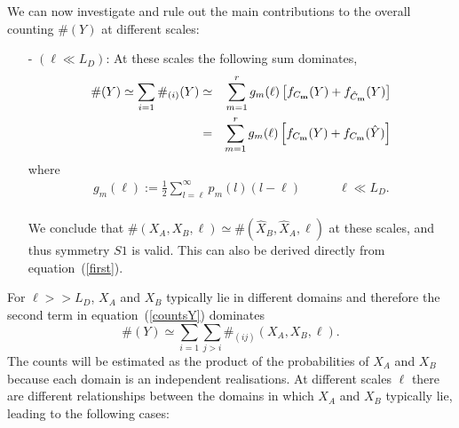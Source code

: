 \documentclass[fleqn,10pt]{wlscirep}
\def\sm{\textbf{\tiny m}}
\begin{document}
We can now investigate and rule out the main contributions to the overall counting $\#(Y)$  at different scales:
\begin{itemize}
\item [-]\textbf{$(\ell \ll L_D)$}: At these scales the following sum dominates,
\begin{eqnarray*}
\#(Y) \simeq \sum_{i=1} \#_{(i)}(Y)&\simeq&
     \sum_{m=1}^r g_m(\ell)  \left[ f_{C_\sm}(Y) + f_{\hat{C}_\sm}(Y) \right] \\
    &=&   \sum_{m=1}^r g_m(\ell) \left[  f_{C_\sm}(Y) +  f_{C_\sm}(\hat{Y}) \right] 
\end{eqnarray*}
where 
\begin{eqnarray}
g_m(\ell):=\frac12\sum_{l=\ell}^{\infty} p_m(l) (l-\ell) \quad \quad \quad \ell \ll L_D.\nonumber
\end{eqnarray} 
\\
We conclude that  $\#(X_A,X_B,\ell) \simeq \#(\hat{X}_B,\hat{X}_A,\ell)$ at these scales, 
and thus symmetry $S1$ is valid.  This can also be derived directly from equation~(\ref{first}).
\vspace{1cm}
\end{itemize}
%
For $\ell >>L_D$, $X_A$ and $X_B$ typically lie in different domains and therefore the  second term  in equation~(\ref{countsY})  dominates
%
$$ \#(Y) \simeq  \sum_{i=1}\sum_{j>i}{\#_{(ij)}(X_A,X_B,\ell)}. $$
%
The counts will be estimated as the product of the probabilities of $X_A$ and $X_B$ because each domain is an independent realisations. At different scales $\ell$ there are different relationships between the domains in which $X_A$ and $X_B$ typically lie, leading to the following  cases:
%
\end{document}
